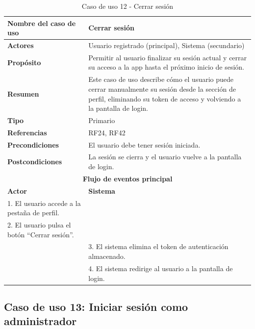 \begin{table}[H]
\centering
\caption{Caso de uso 12 - Cerrar sesión}
\begin{tabular}{|p{4.5cm}|p{10.5cm}|}
\hline
\textbf{Nombre del caso de uso} & Cerrar sesión \\
\hline
\textbf{Actores} & Usuario registrado (principal), Sistema (secundario) \\
\hline
\textbf{Propósito} & Permitir al usuario finalizar su sesión actual y cerrar su acceso a la app hasta el próximo inicio de sesión. \\
\hline
\textbf{Resumen} & Este caso de uso describe cómo el usuario puede cerrar manualmente su sesión desde la sección de perfil, eliminando su token de acceso y volviendo a la pantalla de login. \\
\hline
\textbf{Tipo} & Primario \\
\hline
\textbf{Referencias} & RF24, RF42 \\
\hline
\textbf{Precondiciones} & El usuario debe tener sesión iniciada. \\
\hline
\textbf{Postcondiciones} & La sesión se cierra y el usuario vuelve a la pantalla de login. \\
\hline
\multicolumn{2}{|c|}{\textbf{Flujo de eventos principal}} \\
\hline
\textbf{Actor} & \textbf{Sistema} \\
\hline
1. El usuario accede a la pestaña de perfil. & \\
\hline
2. El usuario pulsa el botón “Cerrar sesión”. & \\
\hline
& 3. El sistema elimina el token de autenticación almacenado. \\
\hline
& 4. El sistema redirige al usuario a la pantalla de login. \\
\hline
\end{tabular}
\end{table}

\clearpage
\subsection{Caso de uso 13: Iniciar sesión como administrador}

